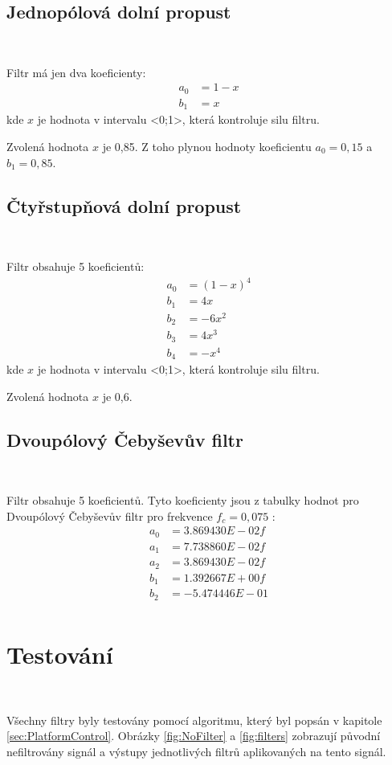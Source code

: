 \subsection{Jednopólová dolní propust}\

Filtr má jen dva koeficienty:
\begin{align}
a_0 &= 1 - x \\
b_1 &= x
\end{align}
kde $x$ je hodnota v intervalu <0;1>, která kontroluje silu filtru\cite{Filters}.

Zvolená hodnota $x$ je 0,85. Z toho plynou hodnoty koeficientu $a_0 = 0,15$ a
$b_1 = 0,85$.

\subsection{Čtyřstupňová dolní propust}\

Filtr obsahuje 5 koeficientů:
\begin{align}
a_0 &= (1 - x)^4 \\
b_1 &= 4x \\
b_2 &= -6x^2 \\
b_3 &= 4x^3 \\
b_4 &= -x^4
\end{align}
kde $x$ je hodnota v intervalu <0;1>, která kontroluje silu filtru\cite{Filters}.

Zvolená hodnota $x$ je 0,6.

\subsection{Dvoupólový Čebyševův filtr}\

Filtr obsahuje 5 koeficientů. Tyto koeficienty jsou z tabulky hodnot pro Dvoupólový Čebyševův filtr pro frekvence $f_c = 0,075$ \cite{Filters}:
\begin{align}
a_0 &= 3.869430E-02f \\
a_1 &= 7.738860E-02f \\
a_2 &= 3.869430E-02f \\
b_1 &= 1.392667E+00f \\
b_2 &= -5.474446E-01 \\
\end{align}

\section{Testování}\

Všechny filtry byly testovány pomocí algoritmu, který byl popsán
v kapitole \ref{sec:PlatformControl}. Obrázky \ref{fig:NoFilter} a \ref{fig:filters}
zobrazují původní nefiltrovány signál a výstupy jednotlivých filtrů
aplikovaných na tento signál.


